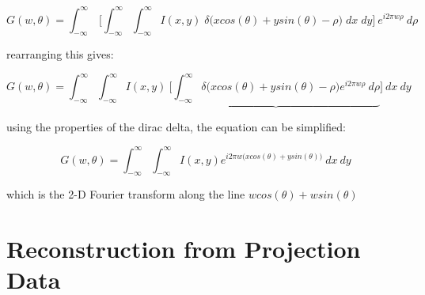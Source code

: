 \begin{equation}
G(w,\theta) = \int_{-\infty}^{\infty} \: \biggl[  \int_{-\infty}^{\infty} \int_{-\infty}^{\infty} I(x,y) \; \delta \big(xcos(\theta) + ysin(\theta) - \rho \big) \; dx \; dy  \biggr] \: e^{i2\pi  w \rho} \: d\rho
\end{equation}

\noindent
rearranging this gives:

\begin{equation}
G(w,\theta) = \int_{-\infty}^{\infty} \int_{-\infty}^{\infty} I(x,y) \: \biggl[ \underbrace{ \int_{-\infty}^{\infty} \delta \big(xcos(\theta) + ysin(\theta) - \rho \big) e^{i2\pi w \rho} \: d\rho} \biggr] \: dx \: dy
\end{equation}

\noindent
using the properties of the dirac delta, the equation can be simplified:

\begin{equation}
G(w,\theta) = \int_{-\infty}^{\infty} \int_{-\infty}^{\infty} I(x,y)   e^{i2\pi w \big(xcos(\theta) + ysin(\theta) \big)} \: dx \: dy 
\end{equation}

\noindent
which is the 2-D Fourier transform along the line $wcos(\theta) + wsin(\theta)$


\section{Reconstruction from Projection Data}